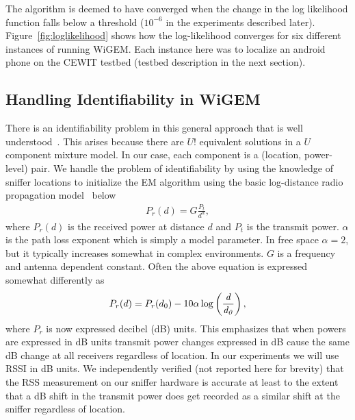 The algorithm is deemed to have converged when the change in the log likelihood function falls below a threshold ($10^{-6}$ in the experiments described later). 
Figure~\ref{fig:loglikelihood} shows how the log-likelihood converges for six different instances of running WiGEM. Each instance here was to localize an android phone on the CEWIT testbed (testbed description in the next section). \\ 


\subsection{Handling Identifiability in WiGEM}
\label{subsec:handlingidentifiabilityinourmodel}

There is an identifiability problem in this general approach that is well understood~\cite{Bishop:2006:PRM:1162264}. This arises because there are $U!$ equivalent solutions
in a $U$ component mixture model. In our case,
each component is a (location,
power-level) pair. 
We handle the problem of identifiability 
by using the knowledge of sniffer locations to initialize the EM algorithm
using the basic log-distance radio propagation model~\cite{Rappaport:2001:WCP:559977, Molkdar91} below
\begin{align}
P_r(d) = G\frac{P_t}{d^\alpha},
\end{align}
where $P_r(d)$ is the received power at distance $d$ and $P_t$ is the transmit power.
$\alpha$ is the path loss exponent which is simply a model parameter. 
In free space $\alpha =2$, but it typically increases somewhat in complex 
environments. $G$ is a frequency and antenna dependent constant. 
Often the above equation is expressed somewhat differently as 
\begin{align}
P_r(d) = P_r({d_0}) - 10\alpha\log\left(\frac {\it d} {\it d_{0}}\right)
	\label{eqn:pathloss_1},
\end{align}
where $P_r$ is now expressed decibel (dB) units. This emphasizes that when powers 
are expressed in dB units transmit power changes expressed in dB cause the same dB change at all receivers
regardless of location. In our experiments we will use RSSI in dB units. We independently
verified (not reported here for brevity) that the RSS measurement on our sniffer hardware is accurate at least to the extent
that a dB shift in the transmit power does get recorded as a similar
shift at the sniffer regardless of location.

